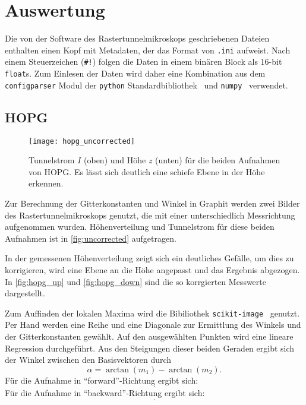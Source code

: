 \section{Auswertung}
\label{sec:Auswertung}

Die von der Software des Rastertunnelmikroskops geschriebenen Dateien enthalten einen Kopf mit Metadaten, der das Format von \texttt{.ini} aufweist.
Nach einem Steuerzeichen (\texttt{\#!}) folgen die Daten in einem binären Block als 16-bit \texttt{float}s.
Zum Einlesen der Daten wird daher eine Kombination aus dem \texttt{configparser} Modul der \texttt{python} Standardbibliothek~\cite{configparser} und \texttt{numpy}~\cite{numpy} verwendet.~\cite{readnid}

\subsection{HOPG}
\begin{figure}
  \centering
  \texttt{[image: hopg\_uncorrected]}
  \caption{%
    Tunnelstrom $I$ (oben) und Höhe $z$ (unten) für die beiden Aufnahmen von HOPG.
    Es lässt sich deutlich eine schiefe Ebene in der Höhe erkennen.%
  }\label{fig:uncorrected}
\end{figure}

Zur Berechnung der Gitterkonstanten und Winkel in Graphit werden zwei Bilder des Rastertunnelmikroskops genutzt, die mit einer unterschiedlich Messrichtung aufgenommen wurden.
Höhenverteilung und Tunnelstrom für diese beiden Aufnahmen ist in \autoref{fig:uncorrected} aufgetragen.

In der gemessenen Höhenverteilung zeigt sich ein deutliches Gefälle, um dies zu korrigieren, wird eine Ebene an die Höhe angepasst und das Ergebnis abgezogen.
In \autoref{fig:hopg_up} und \autoref{fig:hopg_down} sind die so korrgierten Messwerte dargestellt.

Zum Auffinden der lokalen Maxima wird die Bibiliothek \texttt{scikit-image}~\cite{skimage} genutzt.
Per Hand werden eine Reihe und eine Diagonale zur Ermittlung des Winkels und der Gitterkonstanten gewählt.
Auf den ausgewählten Punkten wird eine lineare Regression durchgeführt.
Aus den Steigungen dieser beiden Geraden ergibt sich der Winkel zwischen den Basisvektoren durch
\begin{equation}
  α = \arctan(m_1) -\arctan(m_2).
\end{equation}
Für die Aufnahme in \enquote{forward}-Richtung ergibt sich:
\begin{equation}
  .
\end{equation}
Für die Aufnahme in \enquote{backward}-Richtung ergibt sich:
\begin{equation}
  .
\end{equation}

